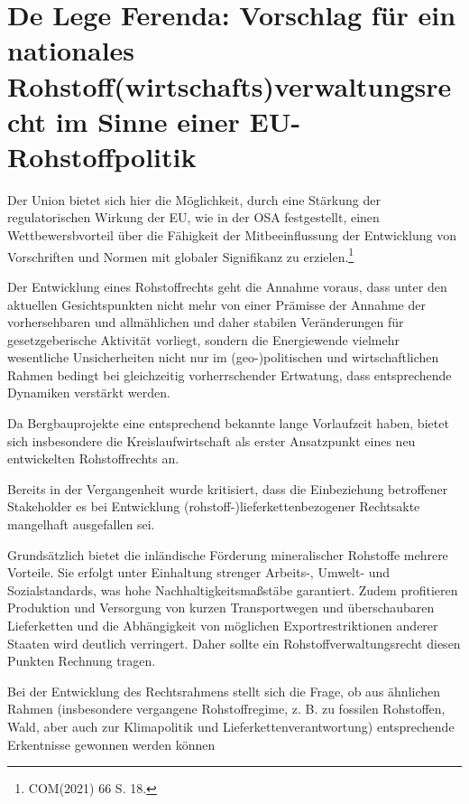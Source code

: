 \documentclass[12pt,a4paper,oneside]{book} %
\begin{document}
	

\section{De Lege Ferenda: Vorschlag für ein nationales Rohstoff(wirtschafts)verwaltungsrecht im Sinne einer EU-Rohstoffpolitik}


Der Union bietet sich hier die Möglichkeit, durch eine Stärkung der regulatorischen Wirkung der EU, wie in der OSA festgestellt, einen Wettbewersbvorteil über die Fähigkeit der Mitbeeinflussung der Entwicklung von Vorschriften und Normen mit globaler Signifikanz zu erzielen.\footnote{COM(2021) 66 S. 18.}

Der Entwicklung eines Rohstoffrechts geht die Annahme voraus, dass unter den aktuellen Gesichtspunkten nicht mehr von einer Prämisse der Annahme der vorhersehbaren und allmählichen und daher stabilen Veränderungen für gesetzgeberische Aktivität vorliegt\autocite{Craig et al, Balancing stability and flexibility in adaptive governance: an analysis of tools available in U.S. environmental law}, sondern die Energiewende vielmehr wesentliche Unsicherheiten nicht nur im (geo-)politischen und wirtschaftlichen Rahmen bedingt bei gleichzeitig vorherrschender Ertwatung, dass entsprechende Dynamiken verstärkt werden.\autocite{bibid}

Da Bergbauprojekte eine entsprechend bekannte lange Vorlaufzeit haben, bietet sich insbesondere die Kreislaufwirtschaft als erster Ansatzpunkt eines neu entwickelten Rohstoffrechts an.

Bereits in der Vergangenheit wurde kritisiert, dass die Einbeziehung betroffener Stakeholder es bei Entwicklung (rohstoff-)lieferkettenbezogener Rechtsakte mangelhaft ausgefallen sei.

Grundsätzlich bietet die inländische Förderung mineralischer Rohstoffe mehrere Vorteile. Sie erfolgt unter Einhaltung strenger Arbeits-, Umwelt- und Sozialstandards, was hohe Nachhaltigkeitsmaßstäbe garantiert. Zudem profitieren Produktion und Versorgung von kurzen Transportwegen und überschaubaren Lieferketten und  die Abhängigkeit von möglichen Exportrestriktionen anderer Staaten wird deutlich verringert. Daher sollte ein Rohstoffverwaltungsrecht diesen Punkten Rechnung tragen.

Bei der Entwicklung des Rechtsrahmens stellt sich die Frage, ob aus ähnlichen Rahmen (insbesondere vergangene Rohstoffregime, z. B. zu fossilen Rohstoffen, Wald, aber auch zur Klimapolitik und Lieferkettenverantwortung) entsprechende Erkentnisse gewonnen werden können
\end{document}
